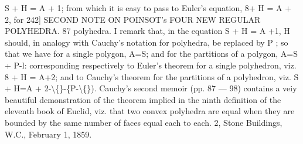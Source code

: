 \documentclass[11pt,a4paper]{book}
\begin{document}
S  +  H  =  A  +  1;    from   which   it   is   easy   to   pass   to   Euler's   equation,    8+  H  =  A  +  2,  for
242]  SECOND    NOTE   ON   POINSOT's   FOUR   NEW   REGULAR   POLYHEDRA.  87
polyhedra.     I   remark    that,  in   the   equation   S  +  H  =  A  +1,  H  should,   in   analogy   with
Cauchy's  notation  for  polyhedra,  be  replaced  by  P ;   so  that  we  have  for  a  single  polygon,
A=S;
and  for  the  partitions  of  a  polygon,
A=S  +  P-l:
corresponding  respectively  to  Euler's  theorem  for  a  single  polyhedron,  viz.
8  +  H  =  A+2;
and  to  Cauchy's  theorem  for  the  partitions  of  a  polyhedron,  viz.
S  +  H=A  +  2-\textbackslash\{\}-\{P-\textbackslash\{\}).
Cauchy's  second  memoir  (pp.  87 — 98)  contains  a  veiy  beautiful  demonstration  of
the  theorem  implied  in  the  ninth  definition  of  the  eleventh  book  of  Euclid,  viz.  that
two  convex  polyhedra  are  equal  when  they  are  bounded  by  the  same  number  of  faces
equal  each  to  each.
2,  Stone  Buildings,   W.C.,  February  1,  1859.


\newpage
\end{document}
